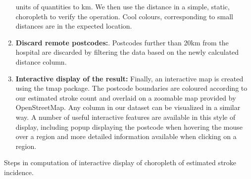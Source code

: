 \documentclass[utf8]{frontiersHLTH}
\begin{document}
\begin{table}[h]
\begin{center}
\begin{mdframed}[backgroundcolor=blue!20]
\begin{enumerate}
  units of quantities to km. We then use the distance in a simple,
  static, choropleth to verify the operation. Cool colours,
  corresponding to small distances are in the expected location.
\item
  {\bf Discard remote postcodes:}. Postcodes further than 20km from the
  hospital are discarded by filtering the data based on the newly
  calculated distance column.
\item
  {\bf Interactive display of the result:} Finally, an interactive map is
  created using the tmap package. The postcode boundaries are coloured
  according to our estimated stroke count and overlaid on a zoomable map
  provided by OpenStreetMap. Any column in our dataset can be visualized
  in a similar way. A number of useful interactive features are
  available in this style of display, including popup displaying the
  postcode when hovering the mouse over a region and more detailed
  information available when clicking on a region.
\end{enumerate}
\end{mdframed}
\end{center}
\caption{Steps in computation of interactive display of choropleth of
  estimated stroke incidence. \label{tab:exampleA}}
\end{table}
\end{document}
